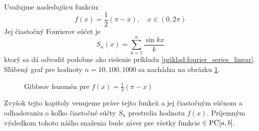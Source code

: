 \begin{priklad}
    Uvažujme nasledujúcu funkciu:
    \begin{equation*}
        f(x) = \frac{1}{2} (\pi-x), \quad x\in(0,2\pi)
    \end{equation*}
    Jej čiastočný Fourierov súčet je
    \begin{equation*}
        S_n(x) = \sum_{k=1}^{n} \frac{\sin kx}{k}
    \end{equation*}
    ktorý sa dá odvodiť podobne ako riešenie príkladu
    \ref{priklad:fourier_series_linear}.
    Sľúbený graf pre hodnoty $n=10,100,1000$ sa nachádza na obrázku
    \ref{fig:gibbs_lin}.
    \begin{figure}[htp]
        \centering
        \caption{Gibbsov fenomén pre $f(x) = \frac{1}{2}(\pi-x)$}
        \label{fig:gibbs_lin}
    \end{figure}    
    \label{priklad:gibbs_linear}
\end{priklad}

Zvyšok tejto kapitoly venujeme práve tejto funkcii a jej čiastočným
súčnom a odhadovaniu o koľko čiastočné súčty $S_n$ prestrelia hodnotu
$f(x)$. Príjemným výsledkom tohoto nášho snaženia bude záver pre
všetky funkcie $\in \mbox{PC}[a,b]$.

